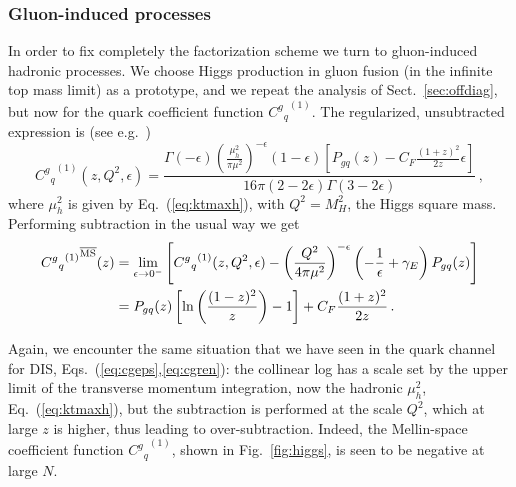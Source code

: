 \subsubsection{Gluon-induced processes}
\label{sec:higgs}
In order to fix completely the factorization scheme we turn to
gluon-induced hadronic processes. We choose Higgs production in gluon
fusion (in the infinite top mass limit) as a prototype, and we repeat the  analysis of
Sect.~\ref{sec:offdiag}, but now for the quark coefficient function
${{{C^g}_q}^{(1)}}$. The regularized, unsubtracted expression is (see
e.g.~\cite{Maltoni:2018dar}) 
\begin{equation}\label{eq:cgqeps}
{C^g{}_q}^{(1)}(z,Q^2,\epsilon) =
  \frac{ \Gamma(-\epsilon)
  \left(\frac{\mu_h^2}{\pi\mu^2}\right)^{-\epsilon} (1-\epsilon) \left[P_{gq}(z) - C_F \frac{(1+z)^2}{2z} \epsilon \right]}{16\pi (2 - 2\epsilon) \Gamma (3 - 2 \epsilon)}\,,
\end{equation}
where $\mu_h^2$ is given by Eq.~(\ref{eq:ktmaxh}), with $Q^2=M_H^2$,
the Higgs square mass.
Performing  \msbar{} subtraction in the usual way we get
\begin{align}\label{eq:cgqren}
{  {C^g{}_q}^{(1)}}^{{\overline{\textrm{{MS}}}}}(z) &= \lim_{\epsilon\to
  0^-}\left[{{C^{g}}_q}^{(1)}(z,Q^2,\epsilon) - \left(\frac{Q^2}{4\pi
      \mu^2}\right)^{-\epsilon} \left(-\frac 1
    {\epsilon}+\gamma_E\right) P_{gq}(z)\right]\\
&= P_{gq}(z)\left[\ln\left(\frac{(1-z)^2}{z}\right) - 1 \right]  + C_F \frac{(1+z)^2}{2z} 
 \,.\label{eq:cgqnlo}
\end{align}

Again, we encounter the same situation that we have seen in the quark
channel for DIS, Eqs.~(\ref{eq:cgeps},\ref{eq:cgren}): the collinear
log has a scale set by the upper limit of the transverse momentum
integration, now the hadronic $\mu_h^2$, Eq.~(\ref{eq:ktmaxh}), but the
\msbar{} subtraction is performed at the scale $Q^2$, which at large $z$
is higher, thus leading to over-subtraction. Indeed, the Mellin-space
\msbar{} coefficient function  ${{{C^g}_q}^{(1)}}$, shown in
Fig.~\ref{fig:higgs}, is seen to be negative at large $N$.

